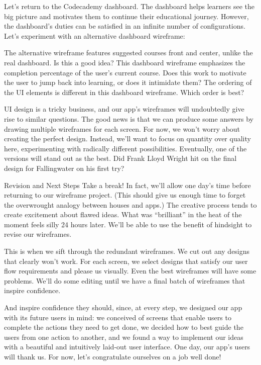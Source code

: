         Let’s return to the Codecademy dashboard. The dashboard helps learners see the big picture and motivates them to continue their educational journey. However, the dashboard’s duties can be satisfied in an infinite number of configurations. Let’s experiment with an alternative dashboard wireframe:

        The alternative wireframe features suggested courses front and center, unlike the real dashboard. Is this a good idea? This dashboard wireframe emphasizes the completion percentage of the user’s current course. Does this work to motivate the user to jump back into learning, or does it intimidate them? The ordering of the UI elements is different in this dashboard wireframe. Which order is best?

        UI design is a tricky business, and our app’s wireframes will undoubtedly give rise to similar questions. The good news is that we can produce some answers by drawing multiple wireframes for each screen. For now, we won’t worry about creating the perfect design. Instead, we’ll want to focus on quantity over quality here, experimenting with radically different possibilities. Eventually, one of the versions will stand out as the best. Did Frank Lloyd Wright hit on the final design for Fallingwater on his first try?

    Revision and Next Steps
        Take a break! In fact, we’ll allow one day’s time before returning to our wireframe project. (This should give us enough time to forget the overwrought analogy between houses and apps.) The creative process tends to create excitement about flawed ideas. What was “brilliant” in the heat of the moment feels silly 24 hours later. We’ll be able to use the benefit of hindsight to revise our wireframes.

        This is when we sift through the redundant wireframes. We cut out any designs that clearly won’t work. For each screen, we select designs that satisfy our user flow requirements and please us visually. Even the best wireframes will have some problems. We’ll do some editing until we have a final batch of wireframes that inspire confidence.

        And inspire confidence they should, since, at every step, we designed our app with its future users in mind: we conceived of screens that enable users to complete the actions they need to get done, we decided how to best guide the users from one action to another, and we found a way to implement our ideas with a beautiful and intuitively laid-out user interface. One day, our app’s users will thank us. For now, let’s congratulate ourselves on a job well done!

